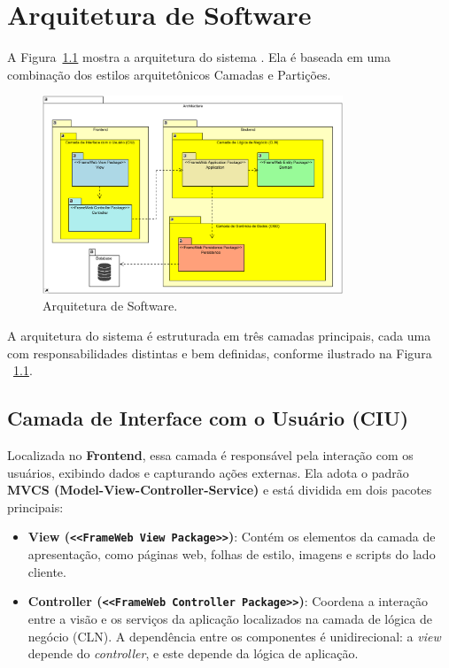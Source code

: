 
\chapter{Arquitetura de Software}
\label{sec-arquitetura}
\vspace{-1cm}

A Figura~\ref{figura-arquitetura} mostra a arquitetura do sistema \emph{\imprimirtitulo}. Ela é baseada em uma combinação dos estilos arquitetônicos Camadas e Partições.

\begin{figure}[h]
	\centering
	\includegraphics[width=0.8\textwidth]{figuras/architecture_novo.png}
	\caption{Arquitetura de Software.}
	\label{figura-arquitetura}
\end{figure}

A arquitetura do sistema é estruturada em três camadas principais, cada uma com responsabilidades distintas e bem definidas, conforme ilustrado na Figura ~\ref{figura-arquitetura}.

\section{Camada de Interface com o Usuário (CIU)}

Localizada no \textbf{Frontend}, essa camada é responsável pela interação com os usuários, exibindo dados e capturando ações externas. Ela adota o padrão \textbf{MVCS (Model-View-Controller-Service)} e está dividida em dois pacotes principais:

\begin{itemize}
	\item \textbf{View (\texttt{<<FrameWeb View Package>>})}: Contém os elementos da camada de apresentação, como páginas web, folhas de estilo, imagens e scripts do lado cliente.
	\item \textbf{Controller (\texttt{<<FrameWeb Controller Package>>})}: Coordena a interação entre a visão e os serviços da aplicação localizados na camada de lógica de negócio (CLN). A dependência entre os componentes é unidirecional: a \textit{view} depende do \textit{controller}, e este depende da lógica de aplicação.
\end{itemize}

